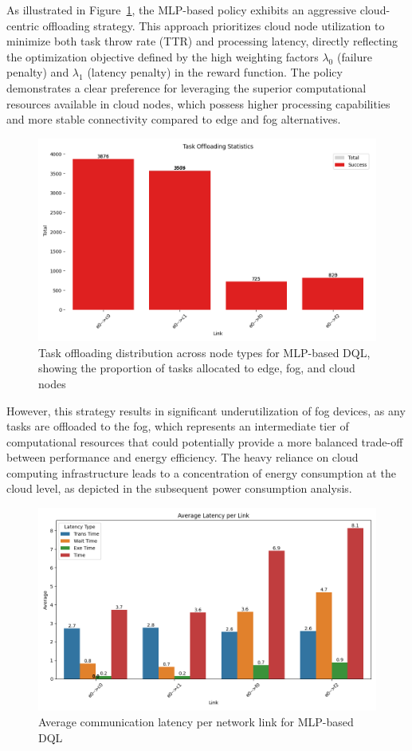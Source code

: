 \documentclass[preprint,3p,authoryear]{elsarticle}
\begin{document}
As illustrated in Figure~\ref{fig:mlp-task-offloading-stats}, the MLP-based policy exhibits an aggressive cloud-centric offloading strategy. This approach prioritizes cloud node utilization to minimize both task throw rate (TTR) and processing latency, directly reflecting the optimization objective defined by the high weighting factors $\lambda_0$ (failure penalty) and $\lambda_1$ (latency penalty) in the reward function. The policy demonstrates a clear preference for leveraging the superior computational resources available in cloud nodes, which possess higher processing capabilities and more stable connectivity compared to edge and fog alternatives.

\begin{figure}[H]
    \centering
    \includegraphics[width=0.5\linewidth]{figs/MLP/task_offloading_statistics.png}
    \caption{Task offloading distribution across node types for MLP-based DQL, showing the proportion of tasks allocated to edge, fog, and cloud nodes}
    \label{fig:mlp-task-offloading-stats}
\end{figure}

However, this strategy results in significant underutilization of fog devices, as any tasks are offloaded to the fog, which represents an intermediate tier of computational resources that could potentially provide a more balanced trade-off between performance and energy efficiency. The heavy reliance on cloud computing infrastructure leads to a concentration of energy consumption at the cloud level, as depicted in the subsequent power consumption analysis.

\begin{figure}[H]
    \centering
    \includegraphics[width=0.5\linewidth]{figs/MLP/avg_latency_per_link.png}
    \caption{Average communication latency per network link for MLP-based DQL}
    \label{fig:mlp-avg-latency}
\end{figure}
\end{document}
